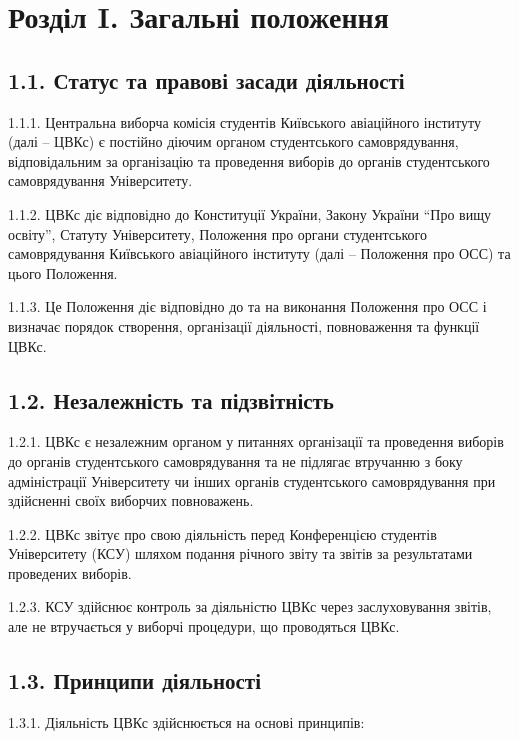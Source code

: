 \section*{Розділ I. Загальні положення}

\subsection*{1.1. Статус та правові засади діяльності}
    1.1.1. Центральна виборча комісія студентів Київського авіаційного інституту (далі -- ЦВКс) є постійно діючим органом студентського самоврядування, відповідальним за організацію та проведення виборів до органів студентського самоврядування Університету.

    1.1.2. ЦВКс діє відповідно до Конституції України, Закону України ``Про вищу освіту'', Статуту Університету, Положення про органи студентського самоврядування Київського авіаційного інституту (далі -- Положення про ОСС) та цього Положення.

    1.1.3. Це Положення діє відповідно до та на виконання Положення про ОСС і визначає порядок створення, організації діяльності, повноваження та функції ЦВКс.

\subsection*{1.2. Незалежність та підзвітність}
    1.2.1. ЦВКс є незалежним органом у питаннях організації та проведення виборів до органів студентського самоврядування та не підлягає втручанню з боку адміністрації Університету чи інших органів студентського самоврядування при здійсненні своїх виборчих повноважень.

    1.2.2. ЦВКс звітує про свою діяльність перед Конференцією студентів Університету (КСУ) шляхом подання річного звіту та звітів за результатами проведених виборів.

    1.2.3. КСУ здійснює контроль за діяльністю ЦВКс через заслуховування звітів, але не втручається у виборчі процедури, що проводяться ЦВКс.

\subsection*{1.3. Принципи діяльності}
    1.3.1. Діяльність ЦВКс здійснюється на основі принципів:

